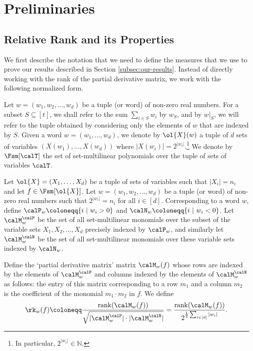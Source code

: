 \documentclass{article}
\begin{document}
\section{Preliminaries}\label{sec:prel}
\subsection{Relative Rank and its Properties}

We first describe the notation that we need to define the measures that we use to prove our results described in Section \ref{subsec:our-results}. Instead of directly working with the rank of the partial derivative matrix, we work with the following normalized form.

\begin{definition}\label{def:rk-rest}
Let $w = (w_1, w_2,\ldots, w_d)$ be a tuple (or word) of non-zero real numbers. For a subset $S \subseteq [t]$, we shall refer to the sum $\sum_{i\in S} w_i$ by $w_S$,  and by $w|_S$, we will refer to the tuple obtained by considering only the
elements of $w$ that are indexed by $S$. 
Given a word $w=(w_1,\ldots,w_d)$, we denote by $\ol{X}(w)$ a tuple of $d$ sets of variables $(X(w_1),\ldots,X(w_d))$ where
$|X(w_i)| = 2^{|w_i|}$.\footnote{In particular, $2^{|w_i|}\in\mathbb{N}$.}
We denote by $\Fsm[\calT]$ the set of set-multilinear polynomials over the tuple
of sets of variables $\calT$.
\end{definition}


\begin{definition}\label{def:relrk}
Let $\ol{X}=(X_1,\ldots,X_d)$ be a tuple of sets of variables such that $|X_i|=n_i$ and let $f\in \Fsm[\ol{X}]$.
 Let $w = (w_1, w_2,\ldots, w_d)$ be a tuple (or word) of non-zero real numbers such that $2^{|w_i|}  = n_i $ for all $i \in [d]$. Corresponding to a word $w$, define $\calP_w \coloneqq \{i\ |\ w_i > 0\}$ and $\calN_w \coloneqq \{i\ |\ w_i < 0\}$. Let $\calM^{\calP}_{w}$ be the
set of all set-multilinear monomials over the subset of the variable sets $X_1, X_2,\ldots, X_d$ precisely
indexed by $\calP_w$, and similarly let $\calM^{\calN}_{w}$ be the set of all set-multilinear monomials over these variable
sets indexed by $\calN_w$.

Define the ‘partial derivative matrix’ matrix $\calM_w(f)$ whose rows are indexed by the elements
of $\calM^{\calP}_w$ and columns indexed by the elements of $\calM^{\calN}_{w}$ as follows: the entry of this matrix corresponding to a
row $m_1$ and a column $m_2$ is the coefficient of the monomial $m_1\cdot m_2$ in $f$. We define
\[
\rk_w(f) \coloneqq \frac{\mathrm{rank}(\calM_w(f))}{\sqrt{|\calM^{\calP}_w|\cdot |\calM^{\calN}_w|}} = \frac{\mathrm{rank}(\calM_w(f))}{2^{\frac{1}{2}\sum_{i\in[d]}|w_i|}}.
\]
\end{definition}
\end{document}
